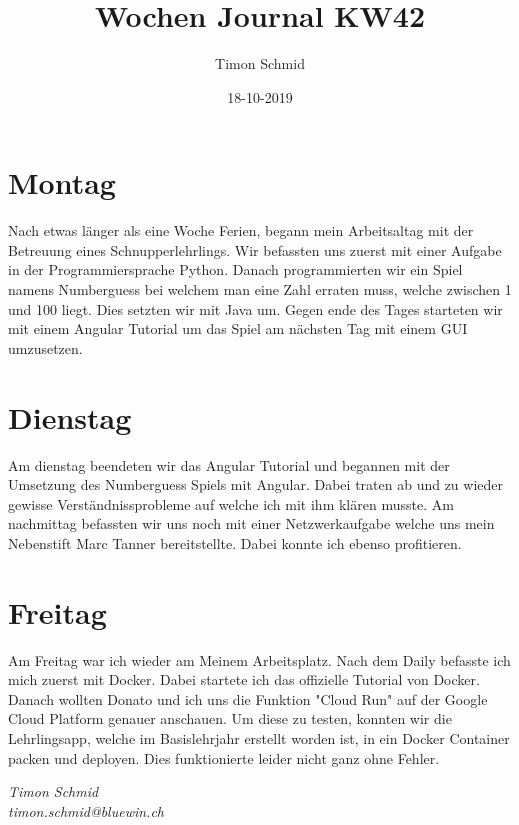 \documentclass[12pt, titlepage]{article}
\title{Wochen Journal KW42}
\date{18-10-2019}
\author{Timon Schmid}
\begin{document}
  \maketitle

  \newpage


  \section{Montag}
  Nach etwas länger als eine Woche Ferien, begann mein Arbeitsaltag mit der Betreuung
  eines Schnupperlehrlings. Wir befassten uns zuerst mit einer Aufgabe in der
  Programmiersprache Python. Danach programmierten wir ein Spiel namens Numberguess
  bei welchem man eine Zahl erraten muss, welche zwischen 1 und 100 liegt.
  Dies setzten wir mit Java um. Gegen ende des Tages starteten wir mit einem Angular
  Tutorial um das Spiel am nächsten Tag mit einem GUI umzusetzen.

  \section{Dienstag}
  Am dienstag beendeten wir das Angular Tutorial und begannen mit der Umsetzung des
  Numberguess Spiels mit Angular. Dabei traten ab und zu wieder gewisse
  Verständnissprobleme auf welche ich mit ihm klären musste. Am nachmittag
  befassten wir uns noch mit einer Netzwerkaufgabe welche uns mein Nebenstift
  Marc Tanner bereitstellte. Dabei konnte ich ebenso profitieren.

  \section{Freitag}
  Am Freitag war ich wieder am Meinem Arbeitsplatz. Nach dem Daily befasste ich mich
  zuerst mit Docker. Dabei startete ich das offizielle Tutorial von Docker. Danach
  wollten Donato und ich uns die Funktion "Cloud Run" auf der Google Cloud Platform
  genauer anschauen. Um diese zu testen, konnten wir die Lehrlingsapp, welche im
  Basislehrjahr erstellt worden ist, in ein Docker Container packen und deployen.
  Dies funktionierte leider nicht ganz ohne Fehler.

  \textit{Timon Schmid \\ timon.schmid@bluewin.ch}
\end{document}
